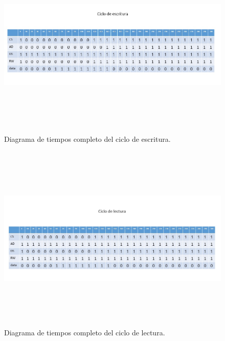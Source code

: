 \documentclass[12pt,a4paper]{article}
\begin{document}
		\begin{figure}[htbp]
			\centering
			\includegraphics[height=9cm, width=16cm]{img/diagramatiempoescritura.jpg}
			\caption[3erNivel]{Diagrama de tiempos completo del ciclo de escritura.}
			\label{fig:DTE}
		\end{figure}
		\begin{figure}[htbp]
			\centering
			\includegraphics[height=9cm, width=16cm]{img/diagramatiempolectura.jpg}
			\caption[3erNivel]{Diagrama de tiempos completo del ciclo de lectura.}
			\label{fig:DTL}
		\end{figure}
\end{document}

